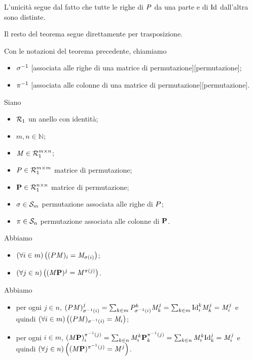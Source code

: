 \par L'unicit\`a segue dal fatto che tutte le righe di $P$
da una parte e di $\Identity$ dall'altra sono distinte.
\par Il resto del teorema segue direttamente per trasposizione. \EndProof
\begin{Definition}
  Con le notazioni del teorema precedente, chiamiamo
  \begin{itemize}
    \item $\Permutation^{-1}$
      [associata alle righe di una matrice di permutazione][permutazione];
    \item $\pi^{-1}$
      [associata alle colonne di una matrice di permutazione][permutazione].
  \end{itemize}
\end{Definition}
\begin{Theorem}
	Siano
	\begin{itemize}
		\item $\mathcal{R}_1$ un anello con identit\`a;
		\item $m, n \in \mathbb{N}$;
		\item $\mathit{M} \in \mathcal{R}_1^{m \times n}$;
		\item $P \in \mathcal{R}_1^{m \times m}$ matrice di
      permutazione;
		\item $\mathbf{P} \in \mathcal{R}_1^{n \times n}$ matrice di
      permutazione;
    \item $\Permutation \in \SymmetricGroup{m}$ permutazione associata alle
      righe di $P$;
    \item $\pi \in \mathcal{S}_{n}$ permutazione associata alle
      colonne di $\mathbf{P}$.
	\end{itemize}
	Abbiamo
	\begin{itemize}
		\item $\ForAll{i \in m}{(\PermutationMatrix\Matrix)_i = \Matrix_{\Permutation(i)}}$;
		\item $\left ( \forall j \in n \right ) \left ( (\mathit{M}\mathbf{P})^{j} = \mathit{M}^{\pi(j)} \right )$.
	\end{itemize}
\end{Theorem}
\Proof Abbiamo
\begin{itemize}
	\item per ogni $j \in n$, $(\PermutationMatrix\Matrix)_{\Permutation^{-1}(i)}^j = \sum_{k \in m} \PermutationMatrix_{\Permutation^{-1}(i)}^k \Matrix_k^j = \sum_{k \in m} \Identity_i^k \Matrix_k^j = \Matrix_i^j$ e quindi $\ForAll{i \in m}{(\PermutationMatrix\Matrix)_{\Permutation^{-1}(i)} = \Matrix_i}$;
	\item per ogni $i \in m$, $(\Matrix\VarPermutationMatrix)_i^{\VarPermutation^{-1}(j)} = \sum_{k \in n} \Matrix_i^k\VarPermutationMatrix_k^{\VarPermutation^{-1}(j)} = \sum_{k \in n} \Matrix_i^k \Identity_k^j = \Matrix_i^j$ e quindi $\left ( \forall j \in n \right ) \left ( (\mathit{M}\mathbf{P})^{\pi^{-1}(j)} = \mathit{M}^j \right )$. \EndProof
\end{itemize}
